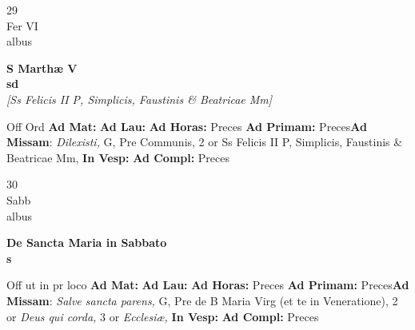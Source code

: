 \documentclass[10pt, openany]{book}
\begin{document}
    \begin{center}
        \begin{minipage}{3.5in}
            \vspace{2em}
            \begin{minipage}{0.5in}
                {\Huge 29} \\
                {\normalsize Fer VI} \\
                {\normalsize albus}
            \end{minipage}
            \begin{minipage}{3.0in}
                \textbf{ \large S Marthæ V \\
                \textnormal{\normalsize sd}} \\ \textit{[Ss Felicis II P, Simplicis, Faustinis \& Beatricae Mm]} \\ 
            \end{minipage}
            \begin{justify}Off Ord
                \textbf{Ad Mat: }
                \textbf{Ad Lau: }
                \textbf{Ad Horas: }Preces
                \textbf{Ad Primam: }Preces\textbf{Ad Missam}: \textit{Dilexisti,} G, Pre Communis, 2 or Ss Felicis II P, Simplicis, Faustinis \& Beatricae Mm,  
                \textbf{In Vesp: }
                \textbf{Ad Compl: }Preces
            \end{justify}
        \end{minipage}
    \end{center}

    \begin{center}
        \begin{minipage}{3.5in}
            \vspace{2em}
            \begin{minipage}{0.5in}
                {\Huge 30} \\
                {\normalsize Sabb} \\
                {\normalsize albus}
            \end{minipage}
            \begin{minipage}{3.0in}
                \textbf{ \large De Sancta Maria in Sabbato \\
                \textnormal{\normalsize s}} \\ 
            \end{minipage}
            \begin{justify}Off ut in pr loco
                \textbf{Ad Mat: }
                \textbf{Ad Lau: }
                \textbf{Ad Horas: }Preces
                \textbf{Ad Primam: }Preces\textbf{Ad Missam}: \textit{Salve sancta parens,} G, Pre de B Maria Virg (et te in Veneratione), 2 or \textit{Deus qui corda,} 3 or \textit{Ecclesiæ,}  
                \textbf{In Vesp: }
                \textbf{Ad Compl: }Preces
            \end{justify}
        \end{minipage}
    \end{center}
\end{document}
